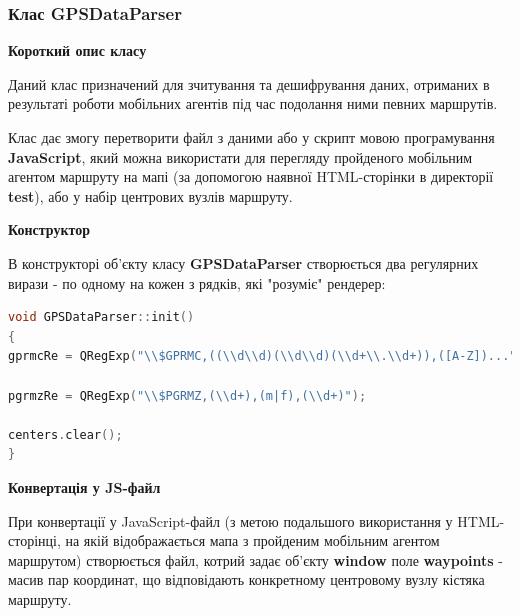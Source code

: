 \documentclass[simple,a4paper,14pt,ukrainian,utf8]{eskdtext}
\begin{document}
        \subsubsection{Клас GPSDataParser}
        
        \textbf{Короткий опис класу}
        
        Даний клас призначений для зчитування та дешифрування даних, отриманих в результаті роботи мобільних агентів під час подолання ними певних маршрутів.
        
        Клас дає змогу перетворити файл з даними або у скрипт мовою програмування \textbf{JavaScript}, який можна використати для перегляду пройденого мобільним агентом маршруту на мапі (за допомогою наявної HTML-сторінки в директорії \textbf{test}), або у набір центрових вузлів маршруту.
        
        \textbf{Конструктор}
        
        В конструкторі об’єкту класу \textbf{GPSDataParser} створюється два регулярних вирази - по одному на кожен з рядків, які "розуміє" рендерер:
        
\begin{small}
\begin{lstlisting}[language=C++]
void GPSDataParser::init()
{
gprmcRe = QRegExp("\\$GPRMC,((\\d\\d)(\\d\\d)(\\d+\\.\\d+)),([A-Z])...");

pgrmzRe = QRegExp("\\$PGRMZ,(\\d+),(m|f),(\\d+)");

centers.clear();
}
\end{lstlisting}
\end{small}
        
        \textbf{Конвертація у JS-файл}
        
        При конвертації у JavaScript-файл (з метою подальшого використання у HTML-сторінці, на якій відображається мапа з пройденим мобільним агентом маршрутом) створюється файл, котрий задає об’єкту \textbf{window} поле \textbf{waypoints} - масив пар координат, що відповідають конкретному центровому вузлу кістяка маршруту.
\end{document}
